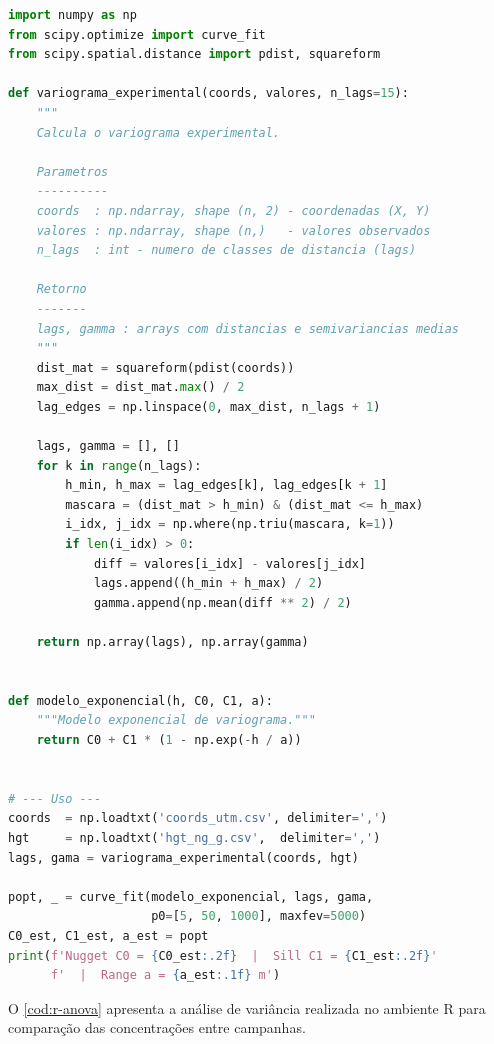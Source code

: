 \begin{lstlisting}[language=Python,
  caption={Script Python para calculo do variograma e ajuste de modelo exponencial.},
  label=cod:python-hg]
import numpy as np
from scipy.optimize import curve_fit
from scipy.spatial.distance import pdist, squareform

def variograma_experimental(coords, valores, n_lags=15):
    """
    Calcula o variograma experimental.
    
    Parametros
    ----------
    coords  : np.ndarray, shape (n, 2) - coordenadas (X, Y)
    valores : np.ndarray, shape (n,)   - valores observados
    n_lags  : int - numero de classes de distancia (lags)
    
    Retorno
    -------
    lags, gamma : arrays com distancias e semivariancias medias
    """
    dist_mat = squareform(pdist(coords))
    max_dist = dist_mat.max() / 2
    lag_edges = np.linspace(0, max_dist, n_lags + 1)

    lags, gamma = [], []
    for k in range(n_lags):
        h_min, h_max = lag_edges[k], lag_edges[k + 1]
        mascara = (dist_mat > h_min) & (dist_mat <= h_max)
        i_idx, j_idx = np.where(np.triu(mascara, k=1))
        if len(i_idx) > 0:
            diff = valores[i_idx] - valores[j_idx]
            lags.append((h_min + h_max) / 2)
            gamma.append(np.mean(diff ** 2) / 2)

    return np.array(lags), np.array(gamma)


def modelo_exponencial(h, C0, C1, a):
    """Modelo exponencial de variograma."""
    return C0 + C1 * (1 - np.exp(-h / a))


# --- Uso ---
coords  = np.loadtxt('coords_utm.csv', delimiter=',')
hgt     = np.loadtxt('hgt_ng_g.csv',  delimiter=',')
lags, gama = variograma_experimental(coords, hgt)

popt, _ = curve_fit(modelo_exponencial, lags, gama,
                    p0=[5, 50, 1000], maxfev=5000)
C0_est, C1_est, a_est = popt
print(f'Nugget C0 = {C0_est:.2f}  |  Sill C1 = {C1_est:.2f}'
      f'  |  Range a = {a_est:.1f} m')
\end{lstlisting}

O \autoref{cod:r-anova} apresenta a análise de variância realizada
no ambiente R para comparação das concentrações entre campanhas.

